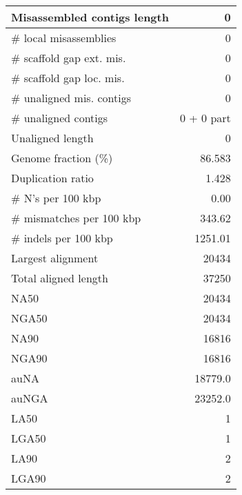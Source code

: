 \documentclass[12pt,a4paper]{article}
\begin{document}
\begin{table}[ht]
\begin{center}
\begin{tabular}{|l*{1}{|r}|}
Misassembled contigs length & 0 \\ \hline
\# local misassemblies & 0 \\ \hline
\# scaffold gap ext. mis. & 0 \\ \hline
\# scaffold gap loc. mis. & 0 \\ \hline
\# unaligned mis. contigs & 0 \\ \hline
\# unaligned contigs & 0 + 0 part \\ \hline
Unaligned length & 0 \\ \hline
Genome fraction (\%) & 86.583 \\ \hline
Duplication ratio & 1.428 \\ \hline
\# N's per 100 kbp & 0.00 \\ \hline
\# mismatches per 100 kbp & 343.62 \\ \hline
\# indels per 100 kbp & 1251.01 \\ \hline
Largest alignment & 20434 \\ \hline
Total aligned length & 37250 \\ \hline
NA50 & 20434 \\ \hline
NGA50 & 20434 \\ \hline
NA90 & 16816 \\ \hline
NGA90 & 16816 \\ \hline
auNA & 18779.0 \\ \hline
auNGA & 23252.0 \\ \hline
LA50 & 1 \\ \hline
LGA50 & 1 \\ \hline
LA90 & 2 \\ \hline
LGA90 & 2 \\ \hline
\end{tabular}
\end{center}
\end{table}
\end{document}

